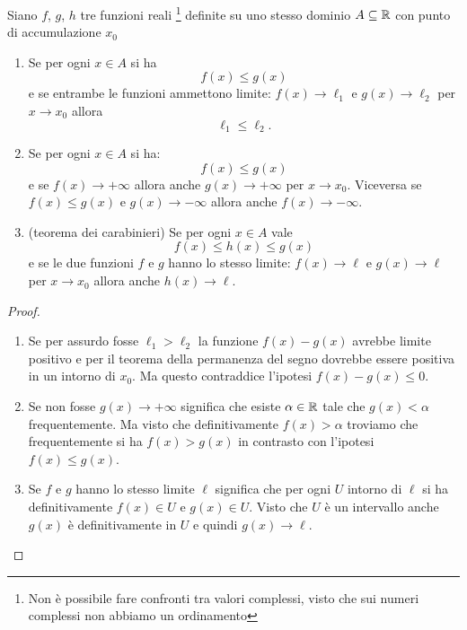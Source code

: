 \begin{theorem}
\label{th:confronto}%
%
%
%
\mymark{***}%
Siano 
$f$, $g$, $h$ tre funzioni reali%
\footnote{Non è possibile fare confronti tra valori complessi, visto che
sui numeri complessi non abbiamo un ordinamento}
definite su uno stesso dominio $A\subseteq \mathbb R$ 
con punto di accumulazione $x_0$
\begin{enumerate}
\item
Se per ogni $x\in A$ si ha
\[
f(x) \le g(x)
\]
e se entrambe le funzioni ammettono limite: $f(x) \to \ell_1$ 
e $g(x) \to \ell_2$ per $x\to x_0$
allora
\[
\ell_1 \le \ell_2.
\]

\item
Se per ogni $x\in A$ si ha:
\[
f(x) \le g(x)
\]
e se $f(x)\to +\infty$ allora anche $g(x) \to +\infty$ per $x\to x_0$.
Viceversa se $f(x) \le g(x)$ e $g(x) \to -\infty$ allora anche $f(x) \to -\infty$.

\item
(teorema dei carabinieri)
%
%
Se per ogni $x\in A$ vale
\[
f(x) \le h(x) \le g(x)
\]
 e se le due
funzioni $f$ e $g$ hanno lo stesso limite: $f(x) \to \ell$ e $g(x)\to \ell$
per $x\to x_0$
allora anche $h(x) \to \ell$.
\end{enumerate}
\end{theorem}
%
\begin{proof}
\mymark{**}
\begin{enumerate}
\item
Se per assurdo fosse $\ell_1 > \ell_2$
la funzione $f(x)-g(x)$ avrebbe limite positivo e per il teorema
della permanenza del segno dovrebbe essere positiva in un intorno di 
$x_0$. Ma questo contraddice l'ipotesi $f(x)-g(x)\le 0$. 

\item Se non fosse $g(x)\to +\infty$ significa che 
esiste $\alpha \in \mathbb R$ tale che $g(x)<\alpha$ frequentemente. 
Ma visto che definitivamente $f(x)>\alpha$ troviamo 
che frequentemente si ha $f(x)>g(x)$ in contrasto con l'ipotesi 
$f(x)\le g(x)$.

\item
Se $f$ e $g$ hanno lo stesso limite $\ell$ significa che per ogni
$U$ intorno di $\ell$ si ha definitivamente $f(x)\in U$ e $g(x)\in U$.
Visto che $U$ è un intervallo anche $g(x)$ è definitivamente in $U$ 
e quindi $g(x)\to \ell$.
\end{enumerate}
\end{proof}

